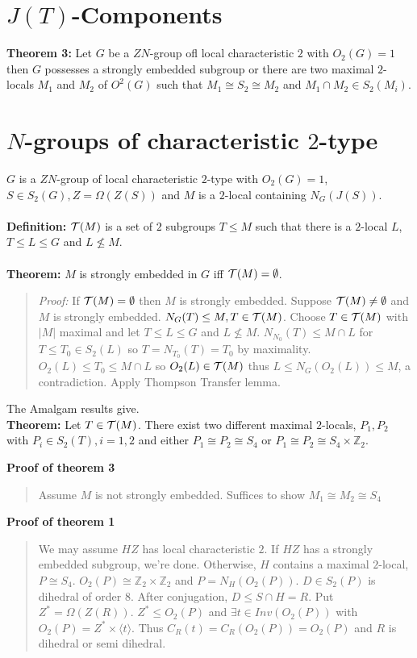 \section{$J(T)$-Components}
{\bf Theorem 3:}  Let $G$ be a $ZN$-group ofl local characteristic $2$ with $O_2(G)=1$ then
$G$ possesses a strongly embedded subgroup or there are two maximal $2$-locals $M_1$ and $M_2$
of $O^2(G)$ such that $M_1 \cong S_2 \cong M_2$ and $M_1 \cap M_2 \in S_2(M_i)$.
\begin{quote}
\end{quote}

\section{$N$-groups of characteristic $2$-type}
$G$ is a $ZN$-group of local characteristic $2$-type with $O_2(G)=1$, $S \in S_2(G), Z = \Omega(Z(S))$
and $M$ is a $2$-local containing $N_G(J(S))$.
\\
\\
{\bf Definition:}  ${\cal T}(M)$ is a set of $2$ subgroups $T \leq M$ such that
there is a $2$-local $L$, $T \leq L \leq G$ and $L \not\leq M$.
\\
\\
{\bf Theorem:} $M$ is strongly embedded in $G$ iff ${\cal T}(M)= \emptyset$.
\begin{quote}
\emph{Proof:} If ${\cal T}(M)= \emptyset$ then $M$ is strongly embedded.  
Suppose ${\cal T}(M) \neq \emptyset$ and $M$ is strongly embedded.  $N_G(T) \leq M, T \in {\cal T}(M)$.
Choose $T \in {\cal T}(M)$ with $|M|$ maximal and let $T \leq L \leq G$ and $L \not\leq M$.
$N_{N_0}(T) \leq M \cap L$ for $T \leq T_0 \in S_2(L)$ so $T=N_{T_0}(T)=T_0$ by maximality.
$O_2(L) \leq T_0 \leq M \cap L$ so $O_2(L) \in {\cal T}(M)$ thus $L \leq N_G(O_2(L)) \leq M$, a contradiction.
Apply Thompson Transfer lemma.
\end{quote}
The Amalgam results give.\\
{\bf Theorem:} Let $T \in {\cal T}(M)$.  There exist two different maximal $2$-locals, $P_1 , P_2$ with
$P_i \in S_2(T), i = 1, 2$ and either $P_1 \cong P_2 \cong S_4$ or $P_1 \cong P_2 \cong S_4 \times {\mathbb Z}_2$.
\begin{quote}
\end{quote}
{\bf Proof of theorem 3}
\begin{quote}
Assume $M$ is not strongly embedded. Suffices to show $M_1 \cong M_2 \cong S_4$
\end{quote}
{\bf Proof of theorem 1}
\begin{quote}
We may assume $HZ$ has local characteristic $2$.  If $HZ$ has a strongly embedded subgroup, we're done.  Otherwise,
$H$ contains a maximal $2$-local, $P \cong S_4$.  $O_2(P) \cong {\mathbb Z}_2 \times {\mathbb Z}_2$ and $P= N_H(O_2(P))$.
$D \in S_2(P)$ is dihedral of order $8$.  After conjugation, $D \leq S \cap H = R$. Put $Z^*= \Omega(Z(R))$. 
$Z^* \leq O_2(P)$ and $\exists t \in Inv(O_2(P))$ with $O_2(P) = Z^* \times \langle t \rangle$.  Thus
$C_R(t) = C_R(O_2(P)) = O_2(P)$ and $R$ is dihedral or semi dihedral.
\end{quote}

